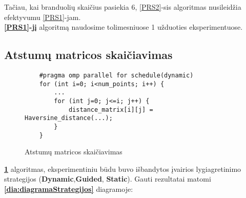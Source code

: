 \documentclass[a4paper,10pt]{article}
\begin{document}
Tačiau, kai branduolių skaičius pasiekia 6, \ref{PRS2}-sis algoritmas nusileidžia efektyvumu \ref{PRS1}-jam. \\ \textbf{\ref{PRS1}-jį} algoritmą naudosime tolimesniuose 1 užduoties eksperimentuose.
\newpage
\subsection{Atstumų matricos skaičiavimas}

\begin{figure}[ht]
	\begin{verbatim}
    #pragma omp parallel for schedule(dynamic)
    for (int i=0; i<num_points; i++) {
        ...
        for (int j=0; j<=i; j++) {
            distance_matrix[i][j] = Haversine_distance(...);
        }
    }
\end{verbatim}
	\caption{Atstumų matricos skaičiavimas}
	\label {matricos algoritmas}
\end{figure}

\textbf{\ref{matricos algoritmas}} algoritmas, eksperimentiniu būdu buvo išbandytos įvairios lygiagretinimo strategijos (\textbf{Dynamic},\textbf{Guided},\textbf{ Static}). Gauti rezultatai matomi \textbf{\ref{dia:diagramaStrategijos}} diagramoje:
\end{document}
